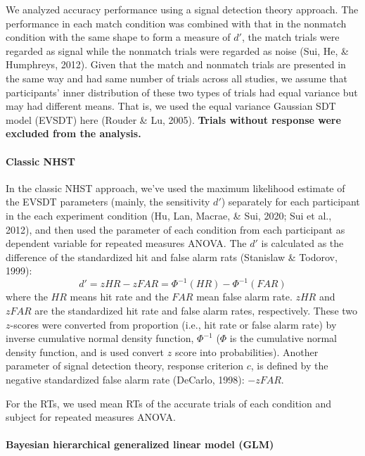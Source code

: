 \documentclass[
  english,
  man]{apa6}
\let\oldparagraph\paragraph
\renewcommand{\paragraph}[1]{\oldparagraph{#1}\mbox{}}
\begin{document}
We analyzed accuracy performance using a signal detection theory approach. The performance in each match condition was combined with that in the nonmatch condition with the same shape to form a measure of \(d'\), the match trials were regarded as signal while the nonmatch trials were regarded as noise (Sui, He, \& Humphreys, 2012). Given that the match and nonmatch trials are presented in the same way and had same number of trials across all studies, we assume that participants' inner distribution of these two types of trials had equal variance but may had different means. That is, we used the equal variance Gaussian SDT model (EVSDT) here (Rouder \& Lu, 2005). \textbf{Trials without response were excluded from the analysis.}

\hypertarget{classic-nhst}{%
\paragraph{Classic NHST}\label{classic-nhst}}

In the classic NHST approach, we've used the maximum likelihood estimate of the EVSDT parameters (mainly, the sensitivity \(d'\)) separately for each participant in the each experiment condition (Hu, Lan, Macrae, \& Sui, 2020; Sui et al., 2012), and then used the parameter of each condition from each participant as dependent variable for repeated measures ANOVA. The \(d'\) is calculated as the difference of the standardized hit and false alarm rats (Stanislaw \& Todorov, 1999):
\[ d' = zHR - zFAR = \Phi^{-1}(HR) - \Phi^{-1}(FAR) \]
where the \(HR\) means hit rate and the \(FAR\) mean false alarm rate. \(zHR\) and \(zFAR\) are the standardized hit rate and false alarm rates, respectively. These two \(z\)-scores were converted from proportion (i.e., hit rate or false alarm rate) by inverse cumulative normal density function, \(\Phi^{-1}\) (\(\Phi\) is the cumulative normal density function, and is used convert \(z\) score into probabilities). Another parameter of signal detection theory, response criterion \(c\), is defined by the negative standardized false alarm rate (DeCarlo, 1998): \(-zFAR\).

For the RTs, we used mean RTs of the accurate trials of each condition and subject for repeated measures ANOVA.

\hypertarget{bayesian-hierarchical-generalized-linear-model-glm}{%
\paragraph{Bayesian hierarchical generalized linear model (GLM)}\label{bayesian-hierarchical-generalized-linear-model-glm}}
\end{document}

